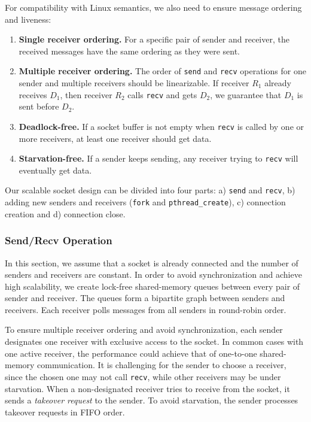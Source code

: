 For compatibility with Linux semantics, we also need to ensure message ordering and liveness:
\begin{enumerate}
\item \textbf{Single receiver ordering.} For a specific pair of sender and receiver, the received messages have the same ordering as they were sent.
\item \textbf{Multiple receiver ordering.} The order of \texttt{send} and \texttt{recv} operations for one sender and multiple receivers should be linearizable. If receiver $R_1$ already receives $D_1$, then receiver $R_2$ calls \texttt{recv} and gets $D_2$, we guarantee that $D_1$ is sent before $D_2$.
\item \textbf{Deadlock-free.} If a socket buffer is not empty when \texttt{recv} is called by one or more receivers, at least one receiver should get data.
\item \textbf{Starvation-free.} If a sender keeps sending, any receiver trying to \texttt{recv} will eventually get data.
\end{enumerate}

Our scalable socket design can be divided into four parts: a) \texttt{send} and \texttt{recv}, b) adding new senders and receivers (\texttt{fork} and \texttt{pthread\_create}), c) connection creation and d) connection close.

\subsubsection{Send/Recv Operation}
\label{subsubsec:fork_rdwr}

In this section, we assume that a socket is already connected and the number of senders and receivers are constant. In order to avoid synchronization and achieve high scalability, we create lock-free shared-memory queues between every pair of sender and receiver. The queues form a bipartite graph between senders and receivers. Each receiver polls messages from all senders in round-robin order.

To ensure multiple receiver ordering and avoid synchronization, each sender designates one receiver with exclusive access to the socket. In common cases with one active receiver, the performance could achieve that of one-to-one shared-memory communication. It is challenging for the sender to choose a receiver, since the chosen one may not call \texttt{recv}, while other receivers may be under starvation. When a non-designated receiver tries to receive from the socket, it sends a \textit{takeover request} to the sender. To avoid starvation, the sender processes takeover requests in FIFO order.

